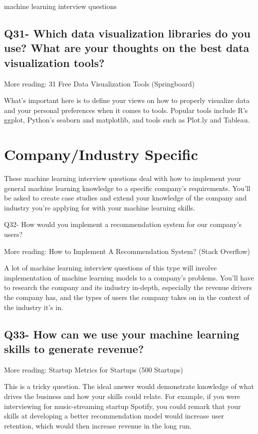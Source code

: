 \documentclass[11pt,a4paper]{article}
\begin{document}
machine learning interview questions

\subsection{Q31- Which data visualization libraries do you use? What are your thoughts on the best data visualization tools?}

More reading: 31 Free Data Visualization Tools (Springboard)

What’s important here is to define your views on how to properly visualize data and your personal preferences when it comes to tools. Popular tools include R’s ggplot, Python’s seaborn and matplotlib, and tools such as Plot.ly and Tableau.



\section{Company/Industry Specific}
These machine learning interview questions deal with how to implement your general machine learning knowledge to a specific company’s requirements. You’ll be asked to create case studies and extend your knowledge of the company and industry you’re applying for with your machine learning skills.

Q32- How would you implement a recommendation system for our company’s users?

More reading: How to Implement A Recommendation System? (Stack Overflow)

A lot of machine learning interview questions of this type will involve implementation of machine learning models to a company’s problems. You’ll have to research the company and its industry in-depth, especially the revenue drivers the company has, and the types of users the company takes on in the context of the industry it’s in.

\subsection{Q33- How can we use your machine learning skills to generate revenue?}

More reading: Startup Metrics for Startups (500 Startups)

This is a tricky question. The ideal answer would demonstrate knowledge of what drives the business and how your skills could relate. For example, if you were interviewing for music-streaming startup Spotify, you could remark that your skills at developing a better recommendation model would increase user retention, which would then increase revenue in the long run.
\end{document}
